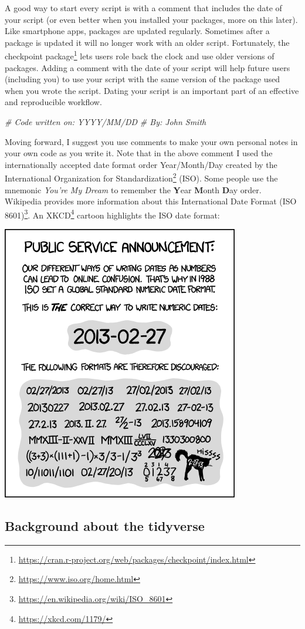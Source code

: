\documentclass[
]{krantz}
\makeatletter
\newenvironment{Shaded}{\begin{snugshade}}{\end{snugshade}}
\newcommand{\CommentTok}[1]{\textcolor[rgb]{0.37,0.37,0.37}{\textit{#1}}}
\renewcommand{\href}[2]{#2\footnote{\url{#1}}}
\newenvironment{kframe}{%
\medskip{}
\setlength{\fboxsep}{.8em}
 \def\at@end@of@kframe{}%
 \ifinner\ifhmode%
  \def\at@end@of@kframe{\end{minipage}}%
  \begin{minipage}{\columnwidth}%
 \fi\fi%
 \def\FrameCommand##1{\hskip\@totalleftmargin \hskip-\fboxsep
 \colorbox{shadecolor}{##1}\hskip-\fboxsep
     \hskip-\linewidth \hskip-\@totalleftmargin \hskip\columnwidth}%
 \MakeFramed {\advance\hsize-\width
   \@totalleftmargin\z@ \linewidth\hsize
   \@setminipage}}%
 {\par\unskip\endMakeFramed%
 \at@end@of@kframe}
\renewenvironment{Shaded}{\begin{kframe}}{\end{kframe}}
\makeatother
\begin{document}
A good way to start every script is with a comment that includes the date of your script (or even better when you installed your packages, more on this later). Like smartphone apps, packages are updated regularly. Sometimes after a package is updated it will no longer work with an older script. Fortunately, the \href{https://cran.r-project.org/web/packages/checkpoint/index.html}{checkpoint package} lets users role back the clock and use older versions of packages. Adding a comment with the date of your script will help future users (including you) to use your script with the same version of the package used when you wrote the script. Dating your script is an important part of an effective and reproducible workflow.

\begin{Shaded}
\begin{Highlighting}[]
\CommentTok{\# Code written on: YYYY/MM/DD }
\CommentTok{\# By: John Smith}
\end{Highlighting}
\end{Shaded}

Moving forward, I suggest you use comments to make your own personal notes in your own code as you write it. Note that in the above comment I used the internationally accepted date format order Year/Month/Day created by the \href{https://www.iso.org/home.html}{International Organization for Standardization} (ISO). Some people use the mnemonic \emph{You're My Dream} to remember the \textbf{Y}ear \textbf{M}onth \textbf{D}ay order. Wikipedia provides more information about this \href{https://en.wikipedia.org/wiki/ISO_8601}{International Date Format (ISO 8601)}. An \href{https://xkcd.com/1179/}{XKCD} cartoon highlights the ISO date format:

\includegraphics[width=0.4\linewidth]{ch_introduction/images/iso8601}

\hypertarget{background-about-the-tidyverse}{%
\subsection{Background about the tidyverse}\label{background-about-the-tidyverse}}
\end{document}
